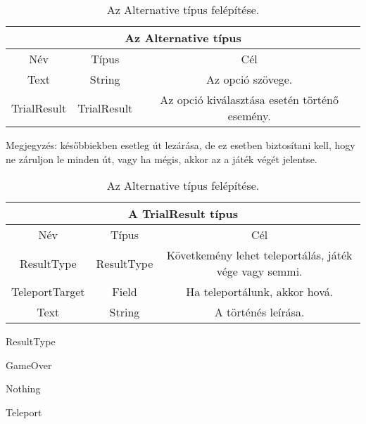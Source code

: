 \begin{table}[H]
	\centering
	\begin{tabular}{ |c|c|c| }
		\hline
		\multicolumn{3}{|c|}{Az Alternative típus}\\
		\hline
		Név & Típus & Cél \\
		\hline
		Text  & String  & Az opció szövege.  \\
		\hline
		TrialResult & TrialResult & Az opció kiválasztása esetén történő esemény.\\
		\hline
	\end{tabular}
	\caption[Alternative típus]{Az Alternative típus felépítése.}
	\label{tab:alternative}
\end{table}

Megjegyzés: későbbiekben esetleg út lezárása, de ez esetben biztosítani kell, hogy ne záruljon le minden út, vagy ha mégis, akkor az a játék végét jelentse.

\begin{table}[H]
	\centering
	\begin{tabular}{ |c|c|c| }
		\hline
		\multicolumn{3}{|c|}{A TrialResult típus}\\
		\hline
		Név & Típus & Cél \\
		\hline
		ResultType  & ResultType  & Követkemény lehet teleportálás, játék vége vagy semmi. \\
		\hline
		TeleportTarget & Field & Ha teleportálunk, akkor hová.\\
		\hline
		Text & String & A történés leírása. \\
		\hline
	\end{tabular}
	\caption[Alternative típus]{Az Alternative típus felépítése.}
	\label{tab:alternative}
\end{table}

ResultType
\begin{compactitem}
	\item GameOver
	\item Nothing
	\item Teleport
\end{compactitem}

